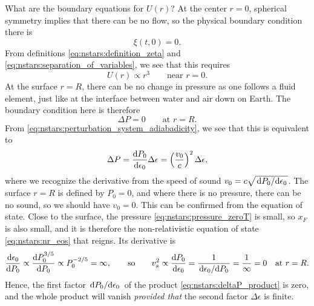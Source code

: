 What are the boundary equations for $U(r)$?
At the center $r = 0$, spherical symmetry implies that there can be no flow, so the physical boundary condition there is
\begin{equation}
	\xi(t, 0) = 0.
\label{eq:nstars:boundary_condition_center_physical}
\end{equation}
From definitions \eqref{eq:nstars:definition_zeta} and \eqref{eq:nstars:separation_of_variables}, we see that this requires
\begin{equation}
	U(r) \propto r^3
	\qquad \text{near } r = 0.
\label{eq:nstars:boundary_condition_center_mathematical}
\end{equation}
At the surface $r = R$, there can be no change in pressure as one follows a fluid element, just like at the interface between water and air down on Earth.
The boundary condition here is therefore
\begin{equation}
	\Delta P = 0
	\qquad \text{at } r = R.
\label{eq:nstars:boundary_condition_surface_physical}
\end{equation}
From \cref{eq:nstars:perturbation_system_adiabadicity}, we see that this is equivalent to
\begin{equation}
	\Delta P = \odv{P_0}{\epsilon_0} \Delta \epsilon = \left( \frac{v_0}{c} \right)^2 \Delta\epsilon ,
\label{eq:nstars:deltaP_product}
\end{equation}
where we recognize the derivative from the speed of sound $v_0 = c \sqrt{\odv{P_0}/{\epsilon_0}}$.
The surface $r = R$ is defined by $P_0 = 0$, and where there is no pressure, there can be no sound, so we should have $v_0 = 0$.
This can be confirmed from the equation of state.
Close to the surface, the pressure \eqref{eq:nstars:pressure_zeroT} is small, so $x_F$ is also small, and it is therefore the non-relativistic equation of state \eqref{eq:nstars:nr_eos} that reigns.
Its derivative is
\begin{equation}
	\odv{\epsilon_0}{P_0} \propto \odv{P_0^{3/5}}{P_0} \propto P_0^{-2/5} = \infty ,
	\qquad \text{so} \qquad
	v_s^2 \propto \odv{P_0}{\epsilon_0} = \frac{1}{\odv{\epsilon_0}/{P_0}} = \frac{1}{\infty} = 0
	\quad \text{at } r = R.
\end{equation}
Hence, the first factor $\odv{P_0}/{\epsilon_0}$ of the product \eqref{eq:nstars:deltaP_product} is zero, and the whole product will vanish \emph{provided that} the second factor $\Delta \epsilon$ is finite.
